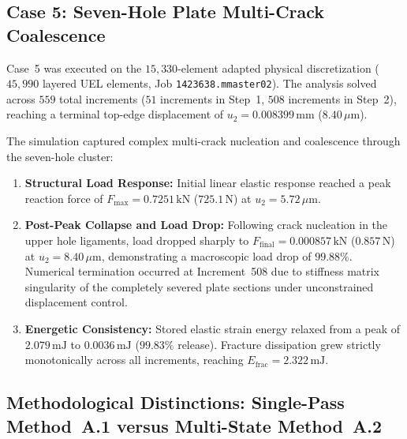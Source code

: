\subsection{Case 5: Seven-Hole Plate Multi-Crack Coalescence}
\label{subsec:case5_coupled_fracture}

Case~5 was executed on the $15,330$-element adapted physical discretization ($45,990$ layered UEL elements, Job \texttt{1423638.mmaster02}). The analysis solved across $559$ total increments ($51$ increments in Step~1, $508$ increments in Step~2), reaching a terminal top-edge displacement of $u_2 = 0.008399\,\mathrm{mm}$ ($8.40\,\mu\mathrm{m}$).

The simulation captured complex multi-crack nucleation and coalescence through the seven-hole cluster:
\begin{enumerate}
  \item \textbf{Structural Load Response:} Initial linear elastic response reached a peak reaction force of $F_{\max} = 0.7251\,\mathrm{kN}$ ($725.1\,\mathrm{N}$) at $u_2 = 5.72\,\mu\mathrm{m}$.
  \item \textbf{Post-Peak Collapse and Load Drop:} Following crack nucleation in the upper hole ligaments, load dropped sharply to $F_{\mathrm{final}} = 0.000857\,\mathrm{kN}$ ($0.857\,\mathrm{N}$) at $u_2 = 8.40\,\mu\mathrm{m}$, demonstrating a macroscopic load drop of $\mathbf{99.88\%}$. Numerical termination occurred at Increment~508 due to stiffness matrix singularity of the completely severed plate sections under unconstrained displacement control.
  \item \textbf{Energetic Consistency:} Stored elastic strain energy relaxed from a peak of $2.079\,\mathrm{mJ}$ to $0.0036\,\mathrm{mJ}$ ($99.83\%$ release). Fracture dissipation grew strictly monotonically across all increments, reaching $E_{\mathrm{frac}} = 2.322\,\mathrm{mJ}$.
\end{enumerate}

\subsection{Methodological Distinctions: Single-Pass Method~A.1 versus Multi-State Method~A.2}
\label{subsec:method_a1_vs_a2_discussion}

